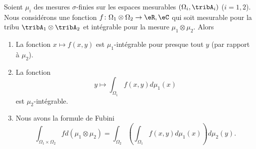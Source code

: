 \begin{theorem}     \label{ThoFubinioYLtPI}
    Soient \( \mu_i\) des mesures \( \sigma\)-finies sur les espaces mesurables \( (\Omega_i,\tribA_i)\) ($i=1,2$). Nous considérons une fonction \( f\colon \Omega_1\otimes\Omega_2\to \eR,\eC\) qui soit mesurable pour la tribu \( \tribA_1\otimes \tribA_2\) et intégrable pour la mesure \( \mu_1\otimes \mu_2\). Alors
    \begin{enumerate}
        \item
            La fonction \( x\mapsto f(x,y)\) est \( \mu_1\)-intégrable pour presque tout \( y\) (par rapport à \( \mu_2\)).
        \item
            La fonction
            \begin{equation}
                y\mapsto\int_{\Omega_1}f(x,y)d\mu_1(x)
            \end{equation}
            est \( \mu_2\)-intégrable. 
        \item
            Nous avons la formule de Fubini
            \begin{equation}
                \int_{\Omega_1\times\Omega_2}fd(\mu_1\otimes\mu_2)=\int_{\Omega_2}\left( \int_{\Omega_1}f(x,y)d\mu_1(x)\right)d\mu_2(y).
            \end{equation}
    \end{enumerate}
\end{theorem}

